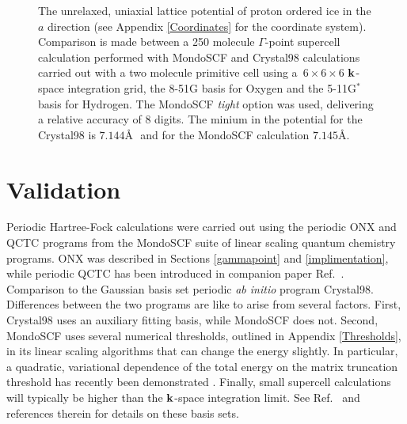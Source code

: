 \documentclass[prb,aps,nobibnotes,twocolumn,doublespace,twocolumngrid,superbib]{revtex4}
\begin{document}
\begin{figure}
\caption{The unrelaxed, uniaxial lattice potential of proton ordered ice \cite{}
in the $a$ direction (see Appendix \ref{Coordinates} for the coordinate system).  
Comparison is made between a 250 molecule $\Gamma$-point supercell calculation performed 
with {\sc MondoSCF} and {\sc Crystal98} calculations carried out with a two molecule primitive
cell using a~$6\times6\times6$ $\bf k$-space integration grid, the 8-51G basis for Oxygen and the 
5-11G$^*$ basis for Hydrogen.  The {\sc MondoSCF} {\it tight} option was used, delivering 
a relative accuracy of 8 digits. The minium in the potential for the {\sc Crystal98} is $7.144$\AA $\,\,$ 
and  for the {\sc MondoSCF} calculation  $7.145$\AA.}
\label{IceEnergyVsLattice}
\end{figure}


\section{Validation}

Periodic Hartree-Fock calculations were carried out using the periodic {\sc ONX} and {\sc QCTC}
programs from the {\sc MondoSCF} suite of linear scaling quantum chemistry programs.  {\sc ONX} was 
described in Sections \ref{gammapoint} and \ref{implimentation}, while periodic {\sc QCTC} has 
been introduced in companion paper Ref.~\cite{CTymczak04a}.   Comparison to the 
Gaussian basis set periodic {\em ab initio} program {\sc Crystal98}.  Differences between the
two programs are like to arise from several factors.  First, {\sc Crystal98} uses an auxiliary
fitting basis, while {\sc MondoSCF} does not.  Second, {\sc MondoSCF} uses several numerical 
thresholds, outlined in Appendix \ref{Thresholds}, in its linear scaling algorithms that can change 
the energy slightly.   In particular, a quadratic, variational dependence of the total energy
on the  matrix truncation threshold has recently been demonstrated \cite{ANiklasson03}.  Finally, 
small supercell calculations will typically be higher than the $\bf k$-space integration limit.
See Ref.~\cite{MTowlerLib} and references therein for details on these basis sets. 
\end{document}
